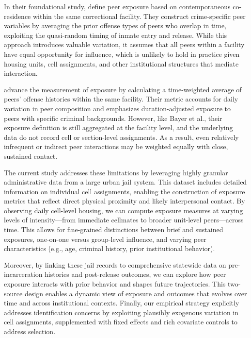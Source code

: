 \documentclass[12pt, a4paper]{article}
\begin{document}
In their foundational study, \citep{bayer2009building} define peer exposure based on contemporaneous co-residence within the same correctional facility. They construct crime-specific peer variables by averaging the prior offense types of peers who overlap in time, exploiting the quasi-random timing of inmate entry and release. While this approach introduces valuable variation, it assumes that all peers within a facility have equal opportunity for influence, which is unlikely to hold in practice given housing units, cell assignments, and other institutional structures that mediate interaction.

\citep{damm2020prison} advance the measurement of exposure by calculating a time-weighted average of peers' offense histories within the same facility. Their metric accounts for daily variation in peer composition and emphasizes duration-adjusted exposure to peers with specific criminal backgrounds. However, like Bayer et al., their exposure definition is still aggregated at the facility level, and the underlying data do not record cell or section-level assignments. As a result, even relatively infrequent or indirect peer interactions may be weighted equally with close, sustained contact.

The current study addresses these limitations by leveraging highly granular administrative data from a large urban jail system. This dataset includes detailed information on individual cell assignments, enabling the construction of exposure metrics that reflect direct physical proximity and likely interpersonal contact. By observing daily cell-level housing, we can compute exposure measures at varying levels of intensity—from immediate cellmates to broader unit-level peers—across time. This allows for fine-grained distinctions between brief and sustained exposures, one-on-one versus group-level influence, and varying peer characteristics (e.g., age, criminal history, prior institutional behavior).

Moreover, by linking these jail records to comprehensive statewide data on pre-incarceration histories and post-release outcomes, we can explore how peer exposure interacts with prior behavior and shapes future trajectories. This two-source design enables a dynamic view of exposure and outcomes that evolves over time and across institutional contexts. Finally, our empirical strategy explicitly addresses identification concerns by exploiting plausibly exogenous variation in cell assignments, supplemented with fixed effects and rich covariate controls to address selection.
\end{document}
